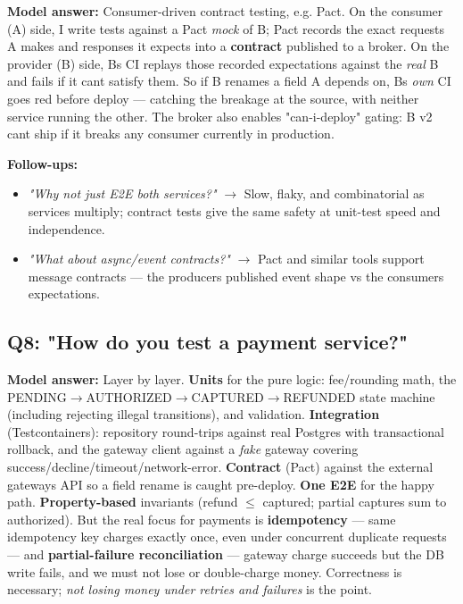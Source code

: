 \documentclass[11pt]{article}
\providecommand{\tightlist}{\setlength{\itemsep}{1pt}\setlength{\parskip}{0pt}}
\begin{document}
\textbf{Model answer:} Consumer-driven contract testing, e.g. Pact. On the consumer (A) side, I write tests against a Pact \emph{mock} of B; Pact records the exact requests A makes and responses it expects into a \textbf{contract} published to a broker. On the provider (B) side, B\textquotesingle s CI replays those recorded expectations against the \emph{real} B and fails if it can\textquotesingle t satisfy them. So if B renames a field A depends on, B\textquotesingle s \emph{own} CI goes red before deploy --- catching the breakage at the source, with neither service running the other. The broker also enables "can-i-deploy" gating: B v2 can\textquotesingle t ship if it breaks any consumer currently in production.

\textbf{Follow-ups:}

\begin{itemize}
\tightlist
\item
  \emph{"Why not just E2E both services?"} \(\rightarrow\) Slow, flaky, and combinatorial as services multiply; contract tests give the same safety at unit-test speed and independence.
\item
  \emph{"What about async/event contracts?"} \(\rightarrow\) Pact and similar tools support message contracts --- the producer\textquotesingle s published event shape vs the consumer\textquotesingle s expectations.
\end{itemize}

\subsection{Q8: "How do you test a payment service?"}\label{q8-how-do-you-test-a-payment-service}

\textbf{Model answer:} Layer by layer. \textbf{Units} for the pure logic: fee/rounding math, the PENDING\(\rightarrow\)AUTHORIZED\(\rightarrow\)CAPTURED\(\rightarrow\)REFUNDED state machine (including rejecting illegal transitions), and validation. \textbf{Integration} (Testcontainers): repository round-trips against real Postgres with transactional rollback, and the gateway client against a \emph{fake} gateway covering success/decline/timeout/network-error. \textbf{Contract} (Pact) against the external gateway\textquotesingle s API so a field rename is caught pre-deploy. \textbf{One E2E} for the happy path. \textbf{Property-based} invariants (refund \(\leq\) captured; partial captures sum to authorized). But the real focus for payments is \textbf{idempotency} --- same idempotency key charges exactly once, even under concurrent duplicate requests --- and \textbf{partial-failure reconciliation} --- gateway charge succeeds but the DB write fails, and we must not lose or double-charge money. Correctness is necessary; \emph{not losing money under retries and failures} is the point.
\end{document}
